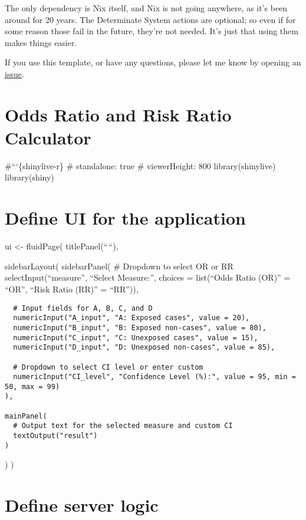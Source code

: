 \documentclass[
  letterpaper,
  paper=6in:9in,
  pagesize=pdftex,
  headinclude=on,
  footinclude=on,
  12pt]{scrbook}
\begin{document}
The only dependency is Nix itself, and Nix is not going anywhere, as
it's been around for 20 years. The Determinate System actions are
optional; so even if for some reason those fail in the future, they're
not needed. It's just that using them makes things easier.

If you use this template, or have any questions, please let me know by
opening an
\href{https://github.com/b-rodrigues/quarto_book_nix/issues}{issue}.


\chapter{Odds Ratio and Risk Ratio
Calculator}\label{odds-ratio-and-risk-ratio-calculator}

\#```\{shinylive-r\} \#\textbar{} standalone: true \#\textbar{}
viewerHeight: 800 library(shinylive) library(shiny)


\chapter{Define UI for the
application}\label{define-ui-for-the-application}

ui \textless- fluidPage( titlePanel(``\,``),

sidebarLayout( sidebarPanel( \# Dropdown to select OR or RR
selectInput(``measure'', ``Select Measure:'', choices = list(``Odds
Ratio (OR)'' = ``OR'', ``Risk Ratio (RR)'' = ``RR'')),

\begin{verbatim}
  # Input fields for A, B, C, and D
  numericInput("A_input", "A: Exposed cases", value = 20),
  numericInput("B_input", "B: Exposed non-cases", value = 80),
  numericInput("C_input", "C: Unexposed cases", value = 15),
  numericInput("D_input", "D: Unexposed non-cases", value = 85),
  
  # Dropdown to select CI level or enter custom
  numericInput("CI_level", "Confidence Level (%):", value = 95, min = 50, max = 99)
),

mainPanel(
  # Output text for the selected measure and custom CI
  textOutput("result")
)
\end{verbatim}

) )


\chapter{Define server logic}\label{define-server-logic}
\end{document}
